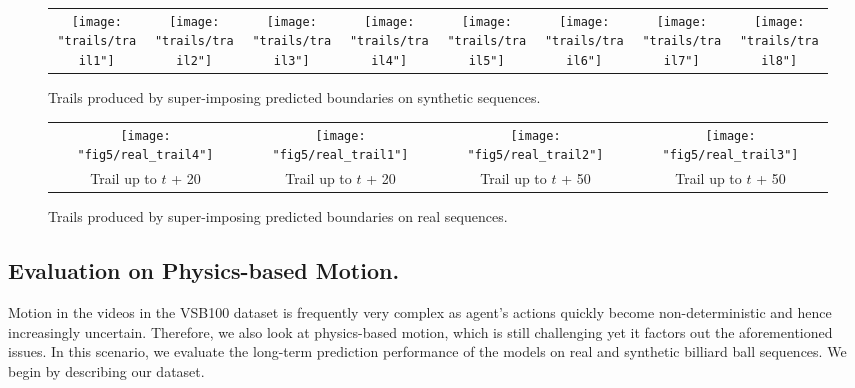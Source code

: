 \begin{figure*}[t]
    \centering
  \begin{tabular}{ cccccccc }
        \texttt{[image: "trails/trail1"]} &   
        \texttt{[image: "trails/trail2"]} &
        \texttt{[image: "trails/trail3"]} &
        \texttt{[image: "trails/trail4"]} &
        \texttt{[image: "trails/trail5"]} &   
        \texttt{[image: "trails/trail6"]} &   
        \texttt{[image: "trails/trail7"]} &   
        \texttt{[image: "trails/trail8"]} \\ 
        \end{tabular}
    \caption{Trails produced by super-imposing predicted boundaries on synthetic sequences.}
    \label{fig:trails}
\end{figure*}
\begin{figure*}[h!]
  
  \centering
  \begin{tabular}{ cccc }
    
    \texttt{[image: "fig5/real\_trail4"]} &
    \texttt{[image: "fig5/real\_trail1"]} &
    \texttt{[image: "fig5/real\_trail2"]}&
    \texttt{[image: "fig5/real\_trail3"]} \\
    
    Trail up to $t$ + 20 & Trail up to $t$ + 20 &  Trail up to $t$ + 50 &  Trail up to $t$ + 50 \\
    
    \end{tabular}
  \caption{Trails produced by super-imposing predicted boundaries on real sequences. }
  \label{fig:bframes}
\end{figure*}


\subsection{Evaluation on Physics-based Motion.}
Motion in the videos in the VSB100 dataset is frequently very complex  as agent's actions quickly become non-deterministic and hence increasingly uncertain. Therefore, we also look at physics-based motion, which is still challenging yet it factors out the aforementioned issues. In this scenario, we evaluate the long-term prediction performance of the models on real and synthetic billiard ball sequences. We begin by describing our dataset.

